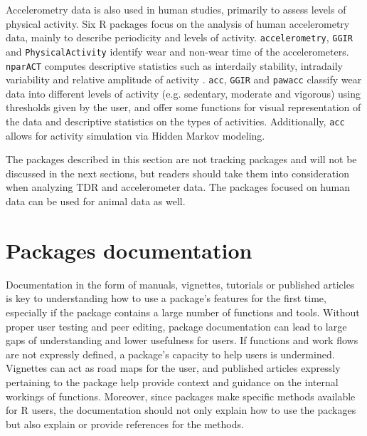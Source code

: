 \documentclass[a4paper,12pt]{article}
\newcommand{\Rpkg}[1]{\texttt{#1}}
\begin{document}
Accelerometry data is also used in human studies, primarily to assess levels of physical activity. Six R packages focus on the analysis of human accelerometry data, mainly to describe periodicity and levels of activity. \Rpkg{accelerometry}, \Rpkg{GGIR} and \Rpkg{PhysicalActivity} identify wear and non-wear time of the accelerometers. \Rpkg{nparACT} computes descriptive statistics such as interdaily stability, intradaily variability and relative amplitude of activity \citep{Blume2016}. \Rpkg{acc}, \Rpkg{GGIR} and \Rpkg{pawacc} classify wear data into different levels of activity (e.g. sedentary, moderate and vigorous) using thresholds given by the user, and offer some functions for visual representation of the data and descriptive statistics on the types of activities. Additionally, \Rpkg{acc} allows for activity simulation via Hidden Markov modeling.

The packages described in this section are not tracking packages and will not be discussed in the next sections, but readers should take them into consideration when analyzing TDR and accelerometer data. The packages focused on human data can be used for animal data as well. 

\section*{Packages documentation}

Documentation in the form of manuals, vignettes, tutorials or published articles is key to understanding how to use a package's features for the first time, especially if the package contains a large number of functions and tools. %
Without proper user testing and peer editing, package documentation can lead to large gaps of understanding and lower usefulness for users. If functions and work flows are not expressly defined, a package's capacity to help users is undermined. Vignettes can act as road maps for the user, and published articles expressly pertaining to the package help provide context and guidance on the internal workings of functions. Moreover, since packages make specific methods available for R users, the documentation should not only explain how to use the packages but also explain or provide references for the methods. %
\end{document}

